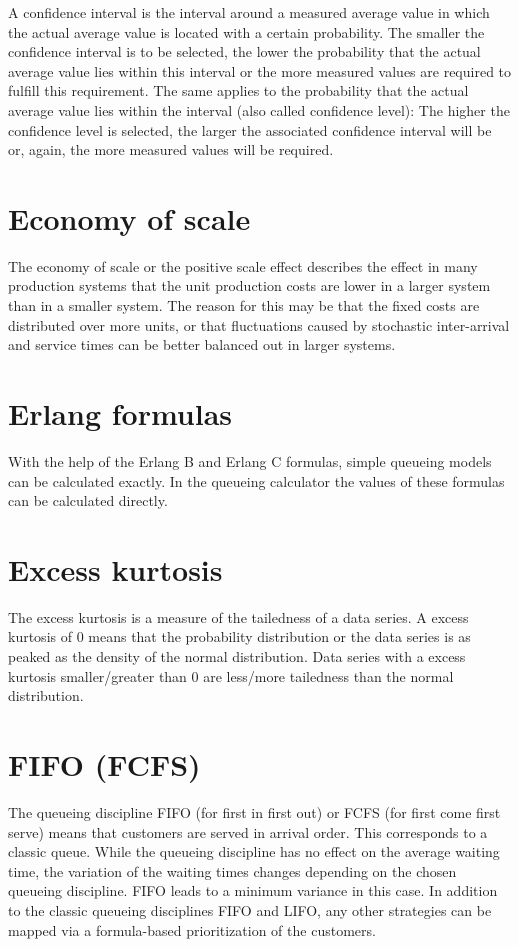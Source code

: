 A confidence interval is the interval around a measured average value in which the actual
average value is located with a certain probability. The smaller the confidence interval
is to be selected, the lower the probability that the actual average value lies within
this interval or the more measured values are required to fulfill this requirement. The
same applies to the probability that the actual average value lies within the interval
(also called confidence level): The higher the confidence level is selected, the larger the
associated confidence interval will be or, again, the more measured values will be required.

\section*{Economy of scale}


The economy of scale or the positive scale effect describes the effect in many production systems
that the unit production costs are lower in a larger system than in a smaller system.
The reason for this may be that the fixed costs are distributed over more units, or that fluctuations
caused by stochastic inter-arrival and service times can be better balanced out in larger systems.

\section*{Erlang formulas}


With the help of the Erlang B and Erlang C formulas, simple queueing models can be calculated exactly.
In the queueing calculator the values of these formulas can be calculated directly.

\section*{Excess kurtosis}


The excess kurtosis is a measure of the tailedness of a data series.
A excess kurtosis of 0 means that the probability distribution or the data series is as peaked as the density of the normal distribution.
Data series with a excess kurtosis smaller/greater than 0 are less/more tailedness than the normal distribution.

\section*{FIFO (FCFS)}


The queueing discipline FIFO (for first in first out) or FCFS (for first come first serve) means
that customers are served in arrival order. This corresponds to a classic queue.
While the queueing discipline has no effect on the average waiting time, the variation
of the waiting times changes depending on the chosen queueing discipline.
FIFO leads to a minimum variance in this case. In addition to the classic queueing disciplines
FIFO and LIFO, any other strategies can be mapped via a formula-based prioritization of the customers.


